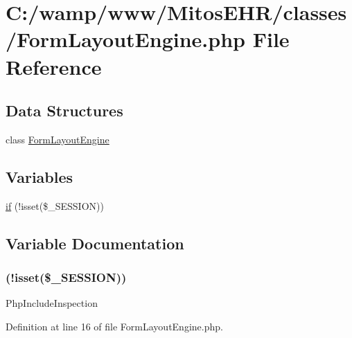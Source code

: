 \hypertarget{_form_layout_engine_8php}{\section{\-C\-:/wamp/www/\-Mitos\-E\-H\-R/classes/\-Form\-Layout\-Engine.php \-File \-Reference}
\label{_form_layout_engine_8php}
}
\subsection*{\-Data \-Structures}
\begin{DoxyCompactItemize}
\item 
class \hyperlink{class_form_layout_engine}{\-Form\-Layout\-Engine}
\end{DoxyCompactItemize}
\subsection*{\-Variables}
\begin{DoxyCompactItemize}
\item 
\hyperlink{_form_layout_engine_8php_a8ceca98aa29914fd2479a84a8d2242fb}{if} (!isset(\$\-\_\-\-S\-E\-S\-S\-I\-O\-N))
\end{DoxyCompactItemize}


\subsection{\-Variable \-Documentation}
\hypertarget{_form_layout_engine_8php_a8ceca98aa29914fd2479a84a8d2242fb}{
\subsubsection[{if}]{(!isset(\$\-\_\-\-S\-E\-S\-S\-I\-O\-N))}}\label{_form_layout_engine_8php_a8ceca98aa29914fd2479a84a8d2242fb}
\-Php\-Include\-Inspection 

\-Definition at line 16 of file \-Form\-Layout\-Engine.\-php.

